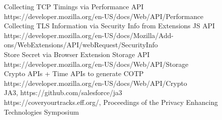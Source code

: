 \documentclass[a4paper, 11pt]{ article}
\begin{document}
\noindent
Collecting TCP Timings via Performance API\\
https://developer.mozilla.org/en-US/docs/Web/API/Performance\\
Collecting TLS Information via Security Info from Extensions JS API\\
https://developer.mozilla.org/en-US/docs/Mozilla/Add-ons/WebExtensions/API/webRequest/SecurityInfo\\

\noindent
Store Secret via Browser Extension Storage API\\
https://developer.mozilla.org/en-US/docs/Web/API/Storage\\

\noindent
Crypto APIs + Time APIs to generate COTP\\
https://developer.mozilla.org/en-US/docs/Web/API/Crypto\\


\noindent
JA3, https://github.com/salesforce/ja3\\

\noindent
https://coveryourtracks.eff.org/, Proceedings of the Privacy Enhancing Technologies Symposium


\end{document}
